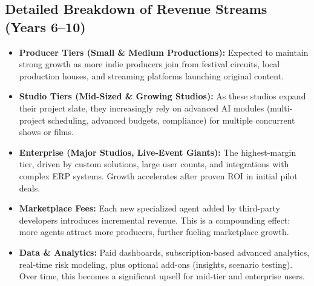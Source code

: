 \documentclass[11pt]{article}
\begin{document}
\subsection{Detailed Breakdown of Revenue Streams (Years 6--10)}
\begin{itemize}
    \item \textbf{Producer Tiers (Small \& Medium Productions):} Expected to maintain strong growth as more indie producers join from festival circuits, local production houses, and streaming platforms launching original content.
    \item \textbf{Studio Tiers (Mid-Sized \& Growing Studios):} As these studios expand their project slate, they increasingly rely on advanced AI modules (multi-project scheduling, advanced budgets, compliance) for multiple concurrent shows or films.
    \item \textbf{Enterprise (Major Studios, Live-Event Giants):} The highest-margin tier, driven by custom solutions, large user counts, and integrations with complex ERP systems. Growth accelerates after proven ROI in initial pilot deals.
    \item \textbf{Marketplace Fees:} Each new specialized agent added by third-party developers introduces incremental revenue. This is a compounding effect: more agents attract more producers, further fueling marketplace growth.
    \item \textbf{Data \& Analytics:} Paid dashboards, subscription-based advanced analytics, real-time risk modeling, plus optional add-ons (insights, scenario testing). Over time, this becomes a significant upsell for mid-tier and enterprise users.
\end{itemize}
\end{document}
